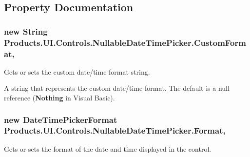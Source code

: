 \subsection{Property Documentation}
\subsubsection[{\texorpdfstring{Custom\+Format}{CustomFormat}}]{\setlength{\rightskip}{0pt plus 5cm}new String Products.\+U\+I.\+Controls.\+Nullable\+Date\+Time\+Picker.\+Custom\+Format\hspace{0.3cm}{\ttfamily [get]}, {\ttfamily [set]}}\hypertarget{class_products_1_1_u_i_1_1_controls_1_1_nullable_date_time_picker_ac69a112261a61aa43137940e04dbe768}{}\label{class_products_1_1_u_i_1_1_controls_1_1_nullable_date_time_picker_ac69a112261a61aa43137940e04dbe768}


Gets or sets the custom date/time format string. 

A string that represents the custom date/time format. The default is a null reference ({\bfseries Nothing} in Visual Basic).

\subsubsection[{\texorpdfstring{Format}{Format}}]{\setlength{\rightskip}{0pt plus 5cm}new Date\+Time\+Picker\+Format Products.\+U\+I.\+Controls.\+Nullable\+Date\+Time\+Picker.\+Format\hspace{0.3cm}{\ttfamily [get]}, {\ttfamily [set]}}\hypertarget{class_products_1_1_u_i_1_1_controls_1_1_nullable_date_time_picker_ab32d444a5ca3ff9a9b63e08394755095}{}\label{class_products_1_1_u_i_1_1_controls_1_1_nullable_date_time_picker_ab32d444a5ca3ff9a9b63e08394755095}


Gets or sets the format of the date and time displayed in the control. 


